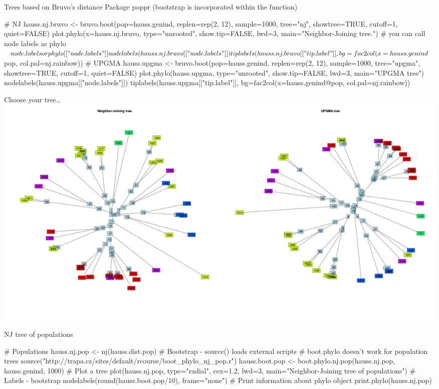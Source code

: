\documentclass[compress, ucs, xelatex, 11pt, xcolor=svgnames,
  hyperref={
    bookmarks=true,
    unicode=true,
    colorlinks=true,
    pdftitle={Molecular data in R},
    plainpages=false,
    pdfauthor={Vojtech Zeisek},
    pdfsubject={Course about phylogeny and evolution in R},
    pdfcreator={XeLaTeX},
    pdfkeywords={R, evolution, phylogeny, molecular data},
    linkcolor=Tomato,
    anchorcolor=SaddleBrown,
    citecolor=Goldenrod,
    filecolor=DarkMagenta,
    menucolor=Sienna,
    urlcolor=DarkTurquoise,
    pdftex},
  url={hyphens, lowtilde} %
  ]{beamer}
\begin{document}
\begin{frame}[fragile]{Trees based on Bruvo's distance}
Package poppr (bootstrap is incorporated within the function)
  \begin{spluscode}
    # NJ
    hauss.nj.bruvo <- bruvo.boot(pop=hauss.genind, replen=rep(2, 12),
      sample=1000, tree="nj", showtree=TRUE, cutoff=1, quiet=FALSE)
    plot.phylo(x=hauss.nj.bruvo, type="unrooted", show.tip=FALSE,
      lwd=3, main="Neighbor-Joining tree.")
    # you can call node labels as phylo$node.labels or phylo[["node.labels"]]
    nodelabels(hauss.nj.bruvo[["node.labels"]]) 
    tiplabels(hauss.nj.bruvo[["tip.label"]], bg=fac2col(x=hauss.genind$pop,
      col.pal=nj.rainbow))
    # UPGMA
    hauss.upgma <- bruvo.boot(pop=hauss.genind, replen=rep(2, 12),
      sample=1000, tree="upgma", showtree=TRUE, cutoff=1, quiet=FALSE)
    plot.phylo(hauss.upgma, type="unrooted", show.tip=FALSE, lwd=3,
      main="UPGMA tree")
    nodelabels(hauss.upgma[["node.labels"]])
    tiplabels(hauss.upgma[["tip.label"]], bg=fac2col(x=hauss.genind@pop,
      col.pal=nj.rainbow))
  \end{spluscode}
\end{frame}

\begin{frame}{Choose your tree\ldots}
\includegraphics[width=\textwidth]{nj-upgma-bruvo.png}
\end{frame}

\begin{frame}[fragile]{NJ tree of populations}
  \begin{spluscode}
    # Populations
    hauss.nj.pop <- nj(hauss.dist.pop)
    # Bootstrap - source() loads external scripts
    # boot.phylo doesn't work for population trees
    source("http://trapa.cz/sites/default/rcourse/boot_phylo_nj_pop.r")
    hauss.boot.pop <- boot.phylo.nj.pop(hauss.nj.pop, hauss.genind, 1000)
    # Plot a tree
    plot(hauss.nj.pop, type="radial", cex=1.2, lwd=3,
      main="Neighbor-Joining tree of populations")
    # Labels - bootstrap
    nodelabels(round(hauss.boot.pop/10), frame="none")
    # Print information about phylo object
    print.phylo(hauss.nj.pop)
  \end{spluscode}
\end{frame}
\end{document}
